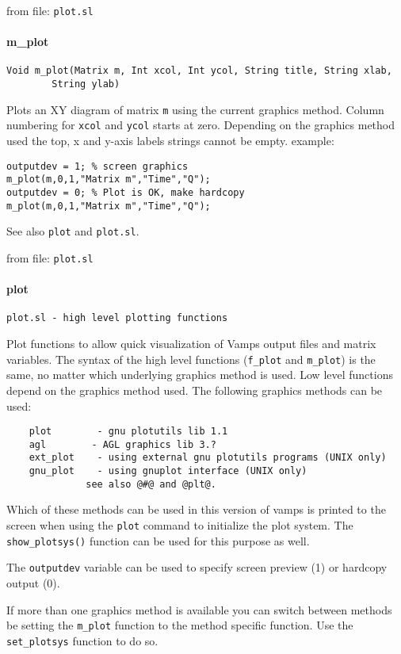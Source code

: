 from file: {\tt plot.sl}


\paragraph{m\_plot}
\begin{verbatim}
Void m_plot(Matrix m, Int xcol, Int ycol, String title, String xlab,
        String ylab)
\end{verbatim}
Plots an XY diagram of matrix {\tt m} using the current graphics method.
Column numbering for {\tt xcol} and {\tt ycol} starts at zero. Depending on the
graphics method used the top, x and y-axis labels strings cannot be empty.
example:
\begin{verbatim}
outputdev = 1; % screen graphics
m_plot(m,0,1,"Matrix m","Time","Q");
outputdev = 0; % Plot is OK, make hardcopy
m_plot(m,0,1,"Matrix m","Time","Q");
\end{verbatim}
See also {\tt plot} and {\tt plot.sl}.

from file: {\tt plot.sl}


\paragraph{plot}
\begin{verbatim}
plot.sl - high level plotting functions
\end{verbatim}
Plot functions to allow quick visualization of Vamps output files
and matrix variables. The syntax of the high level functions ({\tt f\_plot}
and {\tt m\_plot}) is the same, no matter which underlying graphics method
is used. Low level functions depend on the graphics method used. The
following graphics methods can be used:
\begin{verbatim}
    plot        - gnu plotutils lib 1.1
    agl        - AGL graphics lib 3.?
    ext_plot    - using external gnu plotutils programs (UNIX only)    
    gnu_plot    - using gnuplot interface (UNIX only)    
              see also @#@ and @plt@.    
\end{verbatim}
Which of these methods can be used in this version of vamps is
printed to the screen when using the {\tt plot} command to initialize the
plot system. The {\tt show\_plotsys()} function can be used for this purpose
as well.


The {\tt outputdev} variable can be used to specify screen preview (1) or
hardcopy output (0).


If more than one graphics method is available you can switch between 
methods be setting the {\tt m\_plot} function to the method specific function.
Use the {\tt set\_plotsys} function to do so.

